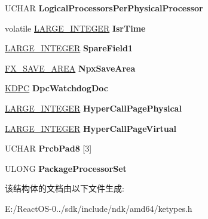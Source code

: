 \begin{DoxyCompactItemize}
U\+C\+H\+AR {\bfseries Logical\+Processors\+Per\+Physical\+Processor}
\item 
\mbox{\label{struct___k_p_r_c_b_a22827c17d4a68a840d48e67858948f78}} 
volatile \hyperlink{union___l_a_r_g_e___i_n_t_e_g_e_r}{L\+A\+R\+G\+E\+\_\+\+I\+N\+T\+E\+G\+ER} {\bfseries Isr\+Time}
\item 
\mbox{\label{struct___k_p_r_c_b_aea78d90477791f0274b66485a4f32fbe}} 
\hyperlink{union___l_a_r_g_e___i_n_t_e_g_e_r}{L\+A\+R\+G\+E\+\_\+\+I\+N\+T\+E\+G\+ER} {\bfseries Spare\+Field1}
\item 
\mbox{\label{struct___k_p_r_c_b_a1981fd9c4fcd994f4bf8b8e2ae466f5a}} 
\hyperlink{struct___f_x___s_a_v_e___a_r_e_a}{F\+X\+\_\+\+S\+A\+V\+E\+\_\+\+A\+R\+EA} {\bfseries Npx\+Save\+Area}
\item 
\mbox{\label{struct___k_p_r_c_b_a185ce35153a9530f310f907a52870fa6}} 
\hyperlink{struct___k_d_p_c}{K\+D\+PC} {\bfseries Dpc\+Watchdog\+Doc}
\item 
\mbox{\label{struct___k_p_r_c_b_a79f21ce21f99aa6137044d47f0ae5eae}} 
\hyperlink{union___l_a_r_g_e___i_n_t_e_g_e_r}{L\+A\+R\+G\+E\+\_\+\+I\+N\+T\+E\+G\+ER} {\bfseries Hyper\+Call\+Page\+Physical}
\item 
\mbox{\label{struct___k_p_r_c_b_aef0c467a694566fcfe592fab21d4a993}} 
\hyperlink{union___l_a_r_g_e___i_n_t_e_g_e_r}{L\+A\+R\+G\+E\+\_\+\+I\+N\+T\+E\+G\+ER} {\bfseries Hyper\+Call\+Page\+Virtual}
\item 
\mbox{\label{struct___k_p_r_c_b_a25645d4774fda22eac561a65eaccb61f}} 
U\+C\+H\+AR {\bfseries Prcb\+Pad8} \mbox{[}3\mbox{]}
\item 
\mbox{\label{struct___k_p_r_c_b_afb53c1d4f0a9ed247df0e40c7950a956}} 
U\+L\+O\+NG {\bfseries Package\+Processor\+Set}
\end{DoxyCompactItemize}


该结构体的文档由以下文件生成\+:\begin{DoxyCompactItemize}
\item 
E\+:/\+React\+O\+S-\/0../sdk/include/ndk/amd64/ketypes.\+h\end{DoxyCompactItemize}
